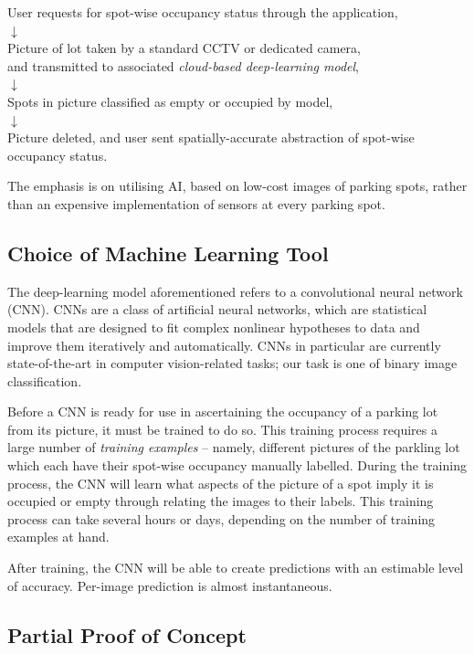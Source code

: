 \documentclass[]{article}
\begin{document}
\begin{center}
User requests for spot-wise occupancy status through the application, \\
$\downarrow$ \\
Picture of lot taken by a standard CCTV or dedicated camera, \\
and transmitted to associated {\it cloud-based deep-learning model}, \\
$\downarrow$ \\
Spots in picture classified as empty or occupied by model, \\
$\downarrow$ \\
Picture deleted, and user sent spatially-accurate abstraction of spot-wise
occupancy status.
\end{center}

The emphasis is on utilising AI, based on low-cost images of
parking spots, rather than an expensive implementation of sensors at every
parking spot.

\subsection{Choice of Machine Learning
Tool}\label{choice-of-machine-learning-tool}

The deep-learning model aforementioned refers to a convolutional neural
network (CNN). CNNs are a class of artificial neural networks, which are
statistical models that are designed to fit complex nonlinear hypotheses
to data and improve them iteratively and automatically. CNNs in
particular are currently state-of-the-art in computer vision-related
tasks; our task is one of binary image classification.

Before a CNN is ready for use in ascertaining the occupancy of a parking
lot from its picture, it must be trained to do so. This training process
requires a large number of \emph{training examples} -- namely, different
pictures of the parkling lot which each have their spot-wise occupancy
manually labelled. During the training process, the CNN will learn what
aspects of the picture of a spot imply it is occupied or empty through
relating the images to their labels. This training process can take
several hours or days, depending on the number of training examples at
hand.

After training, the CNN will be able to create predictions with an
estimable level of accuracy. Per-image prediction is almost
instantaneous.

\subsection{Partial Proof of Concept}\label{partial-proof-of-concept}
\end{document}
